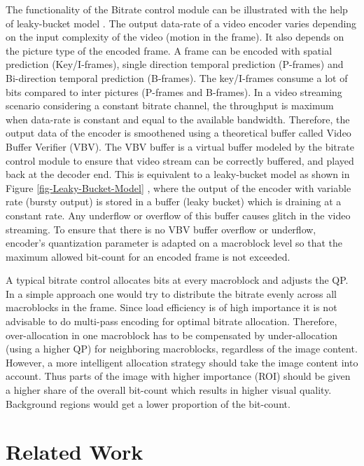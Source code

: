 \documentclass[11pt]{article} %
\begin{document}
	The functionality of the Bitrate control module can be illustrated with the help of leaky-bucket model \cite{InTech-Rate-control-in-video-coding}. The output data-rate of a video encoder varies depending on the input complexity of the video (motion in the frame). It also depends on the picture type of the encoded frame. A frame can be encoded with spatial prediction (Key/I-frames), single direction temporal prediction (P-frames) and Bi-direction temporal prediction (B-frames). The key/I-frames consume a lot of bits compared to inter pictures (P-frames and B-frames). In a video streaming scenario considering a constant bitrate channel, the throughput is maximum when data-rate is constant and equal to the available bandwidth. Therefore, the output data of the encoder is smoothened using a theoretical buffer called Video Buffer Verifier (VBV). The VBV buffer is a virtual buffer modeled by the bitrate control module to ensure that video stream can be correctly buffered, and played back at the decoder end. This is equivalent to a leaky-bucket model as shown in Figure \ref{fig-Leaky-Bucket-Model} \cite{Leaky-bucket-NSI}, where the output of the encoder with variable rate (bursty output) is stored in a buffer (leaky bucket) which is draining at a constant rate.  Any underflow or overflow of this buffer causes glitch in the video streaming. To ensure that there is no VBV buffer overflow or underflow, encoder's quantization parameter is adapted on a macroblock level so that the maximum allowed bit-count for an encoded frame is not exceeded.

 A typical bitrate control allocates bits at every macroblock and adjusts the QP. In a simple approach one would try to distribute the bitrate evenly across all macroblocks in the frame. Since load efficiency is of high importance it is not advisable to do multi-pass encoding for optimal bitrate allocation. Therefore, over-allocation in one macroblock has to be compensated by under-allocation (using a higher QP) for neighboring macroblocks, regardless of the image content. However, a more intelligent allocation strategy should take the image content into account. Thus parts of the image with higher importance (ROI) should be given a higher share of the overall bit-count which results in higher visual quality. Background regions would get a lower proportion of the bit-count.

\section{Related Work}
\end{document}
